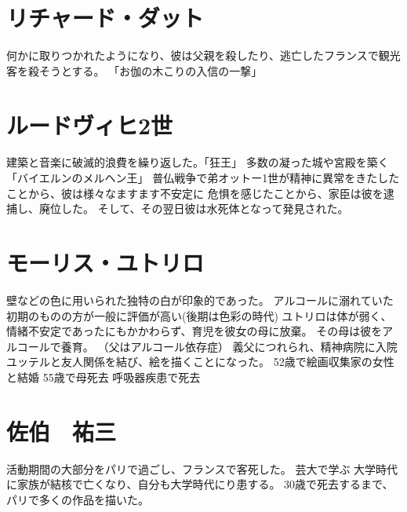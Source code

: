 \documentclass[a4j]{jarticle}
\begin{document}
\chapter{リチャード・ダット}
何かに取りつかれたようになり、彼は父親を殺したり、逃亡したフランスで観光客を殺そうとする。
「お伽の木こりの入信の一撃」
\chapter{ルードヴィヒ2世}
建築と音楽に破滅的浪費を繰り返した。「狂王」
多数の凝った城や宮殿を築く「バイエルンのメルヘン王」
普仏戦争で弟オットー1世が精神に異常をきたしたことから、彼は様々なますます不安定に
危惧を感じたことから、家臣は彼を逮捕し、廃位した。
そして、その翌日彼は水死体となって発見された。
\chapter{モーリス・ユトリロ}
壁などの色に用いられた独特の白が印象的であった。
アルコールに溺れていた初期のものの方が一般に評価が高い(後期は色彩の時代)
ユトリロは体が弱く、情緒不安定であったにもかかわらず、育児を彼女の母に放棄。
その母は彼をアルコールで養育。
（父はアルコール依存症）
義父につれられ、精神病院に入院
ユッテルと友人関係を結び、絵を描くことになった。
52歳で絵画収集家の女性と結婚
55歳で母死去
呼吸器疾患で死去
\chapter{佐伯　祐三}
活動期間の大部分をパリで過ごし、フランスで客死した。
芸大で学ぶ
大学時代に家族が結核で亡くなり、自分も大学時代にり患する。
30歳で死去するまで、パリで多くの作品を描いた。
\end{document}
